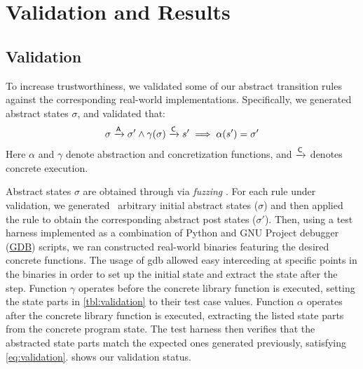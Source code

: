 \chapter{Validation and Results}
\label{ch:eicfg-validation}

\section{Validation}\label{eicfg-validation}
To increase trustworthiness, we validated some of our abstract transition rules against the corresponding real-world implementations. Specifically, we generated abstract states $\sigma$, and validated that:
\begin{equation}
    \sigma\xrightarrow{\mathsf A}\sigma'\land\gamma(\sigma)\xrightarrow{\mathsf C} s'\implies\alpha(s')=\sigma' \label{eq:validation}
\end{equation}
Here $\alpha$ and $\gamma$ denote abstraction and concretization functions, and $\xrightarrow{\mathsf C}$ denotes concrete execution.

Abstract states $\sigma$ are obtained through via \emph{fuzzing} \autocite{quickcheck}.
For each rule under validation, we generated \fuzzcount\ arbitrary initial abstract states ($\sigma$) and then applied the rule to obtain the corresponding abstract post states ($\sigma'$).
Then, using a test harness implemented as a combination of Python and GNU Project debugger (\href{https://www.sourceware.org/gdb/}{GDB}) scripts, we ran constructed real-world binaries featuring the desired concrete functions.
The usage of \acs{gdb} allowed easy interceding at specific points in the binaries in order to set up the initial state and extract the state after the step.
Function $\gamma$ operates before the concrete library function is executed, setting the state parts in \cref{tbl:validation} to their test case values.
Function $\alpha$ operates after the concrete library function is executed, extracting the listed state parts from the concrete program state.
The test harness then verifies that the abstracted state parts match the expected ones generated previously, satisfying \cref{eq:validation}.
 shows our validation status.

